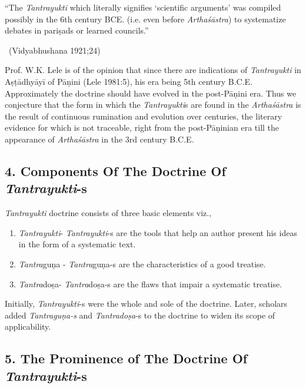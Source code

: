 “The \textit{Tantrayukti} which literally signifies ‘scientific arguments’ was compiled possibly in the 6th century BCE. (i.e. even before \textit{Arthaśāstra}) to systematize debates in pariṣads or learned councils.”

~\hfill (Vidyabhushana 1921;24)

Prof. W.K. Lele is of the opinion that since there are indications of \textit{Tantrayukti} in Aṣṭādhyāyī of Pāṇini (Lele 1981:5), his era being 5th century B.C.E. Approximately the doctrine should have evolved in the post-Pāṇini era. Thus we conjecture that the form in which the \textit{Tantrayukti}s are found in the \textit{Arthaśāstra} is the result of continuous rumination and evolution over centuries, the literary evidence for which is not traceable, right from the post-Pāṇinian era till the appearance of \textit{Arthaśāstra} in the 3rd century B.C.E.


\subsection*{4. Components Of The Doctrine Of \textit{Tantrayukti}-s}

\textit{Tantrayukti} doctrine consists of three basic elements viz.,

\begin{enumerate}[{\rm a.}]
\itemsep=0pt
\item \textit{Tantrayukti}- \textit{Tantrayukti}-s are the tools that help an author present his ideas in the form of a systematic text.

 \item \textit{Tantra}guṇa - \textit{Tantra}guṇa-s are the characteristics of a good treatise.

 \item \textit{Tantra}doṣa- \textit{Tantra}doṣa-s are the flaws that impair a systematic treatise.

\end{enumerate}

Initially, \textit{Tantrayukti}-s were the whole and sole of the doctrine. Later, scholars added \textit{Tantraguṇa-s} and \textit{Tantradoṣa}-s to the doctrine to widen its scope of applicability.

\newpage


\subsection*{5. The Prominence of The Doctrine Of \textit{Tantrayukti}-s}

